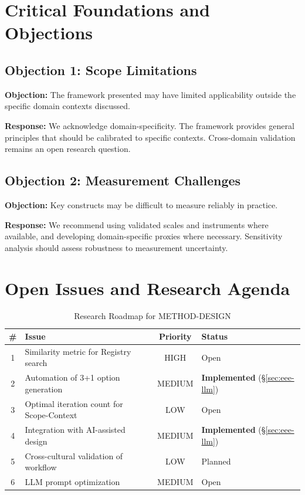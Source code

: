 \section{Critical Foundations and Objections}
\label{sec:dsn-foundations}

\subsection{Objection 1: Scope Limitations}

\textbf{Objection:} The framework presented may have limited applicability
outside the specific domain contexts discussed.

\textbf{Response:} We acknowledge domain-specificity. The framework provides
general principles that should be calibrated to specific contexts. Cross-domain
validation remains an open research question.

\subsection{Objection 2: Measurement Challenges}

\textbf{Objection:} Key constructs may be difficult to measure reliably in
practice.

\textbf{Response:} We recommend using validated scales and instruments where
available, and developing domain-specific proxies where necessary. Sensitivity
analysis should assess robustness to measurement uncertainty.


\section{Open Issues and Research Agenda}
\label{sec:eee-open}

\begin{table}[htbp]
\centering
\caption{Research Roadmap for METHOD-DESIGN}
\label{tab:eee-roadmap}
\renewcommand{\arraystretch}{1.3}
\begin{tabular}{@{}clcl@{}}
\toprule
\textbf{\#} & \textbf{Issue} & \textbf{Priority} & \textbf{Status} \\
\midrule
1 & Similarity metric for Registry search & HIGH & Open \\
2 & Automation of 3+1 option generation & MEDIUM & \textbf{Implemented} (§\ref{sec:eee-llm}) \\
3 & Optimal iteration count for Scope-Context & LOW & Open \\
4 & Integration with AI-assisted design & MEDIUM & \textbf{Implemented} (§\ref{sec:eee-llm}) \\
5 & Cross-cultural validation of workflow & LOW & Planned \\
6 & LLM prompt optimization & MEDIUM & Open \\
\bottomrule
\end{tabular}
\end{table}


